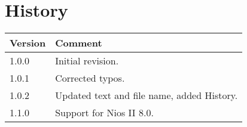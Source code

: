 \chapter{History}

\begin{tabular}{|p{}|p{}|}
\hline 
Version&
Comment\tabularnewline
\hline
\hline 
1.0.0&
Initial revision.\tabularnewline
\hline 
1.0.1&
Corrected typos.\tabularnewline
\hline 
1.0.2&
Updated text and file name, added History.\tabularnewline
\hline 
1.1.0&
Support for Nios II 8.0.
\tabularnewline \hline
\end{tabular}
